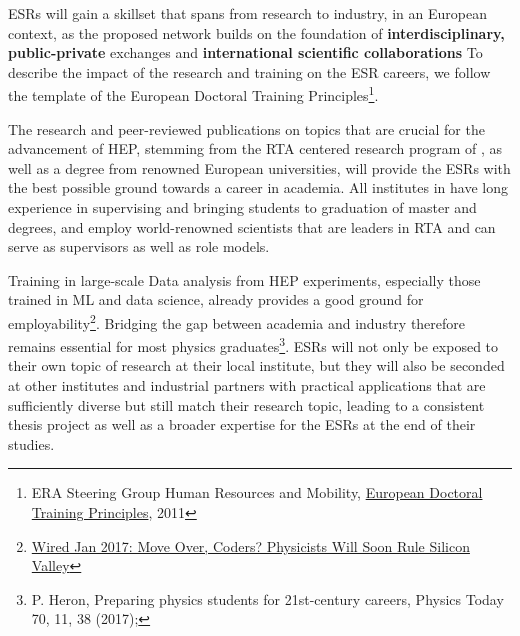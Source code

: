 
ESRs will gain a skillset that spans from research to industry,
in an European context, as the proposed network builds on the foundation of
\textbf{interdisciplinary, public-private} exchanges
and \textbf{international scientific collaborations}
To describe the impact of the research and training on the ESR careers, we follow the template of the European Doctoral Training Principles\footnote{ERA Steering Group Human Resources and Mobility, \href{https://euraxess.ec.europa.eu/belgium/jobs-funding/doctoral-training-principles}{European Doctoral Training Principles}, 2011}. 

\noindent\color{blue}{Research excellence, attractive institutional environment. }\color{black}
The research and peer-reviewed publications on topics that are crucial
for the advancement of HEP, stemming from the RTA centered research program of \acronym,
as well as a \phd degree from renowned European universities, 
will provide the ESRs with the best possible ground towards a career in academia. 
All institutes in \acronym have long
experience in supervising and bringing students to graduation of master and \phd degrees, 
and employ world-renowned scientists that are leaders in RTA and 
can serve as supervisors as well as role models. 

\noindent\color{blue}{Interdisciplinary Research Options, Exposure to Industry and other relevant employment sectors. }\color{black}
Training in large-scale Data analysis from HEP experiments, especially those trained in ML and data science, already provides a good ground for employability\footnote{
\href{https://www.wired.com/2017/01/move-coders-physicists-will-soon-rule-silicon-valley/}{Wired Jan 2017: Move Over, Coders? Physicists Will Soon Rule Silicon Valley}}.
Bridging the gap between academia and industry therefore remains essential for most 
physics graduates\footnote{P. Heron, Preparing physics students for
21st-century careers, Physics Today 70, 11, 38 (2017);}. 
ESRs will not only be exposed to their
own topic of research at their local institute, but they will 
also be seconded at other institutes and industrial partners with practical
applications that are sufficiently diverse but still match
their research topic, leading to a consistent thesis project as well
as a broader expertise for the ESRs at the end of their studies.


